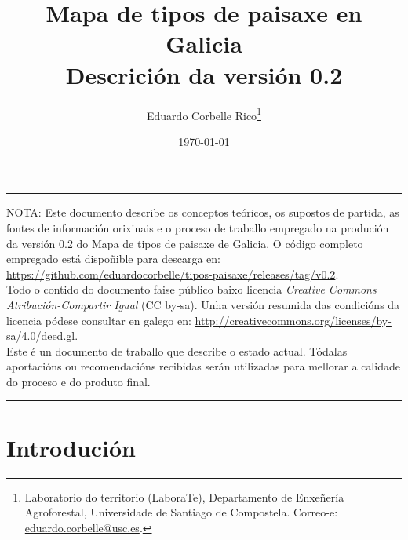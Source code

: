 \documentclass[11pt,a4paper]{article}
\title{Mapa de tipos de paisaxe en Galicia\\Descrición da versión 0.2}
\author{Eduardo Corbelle Rico\thanks{Laboratorio do territorio (LaboraTe), Departamento de Enxeñería Agroforestal, Universidade de Santiago de Compostela. Correo-e: \href{mailto:eduardo.corbelle@usc.es}{eduardo.corbelle@usc.es}.}}
\date{\today}
\begin{document}
\maketitle

\hrule
 \vspace{.2cm}
  \begin{footnotesize}
   \noindent NOTA: Este documento describe os conceptos teóricos, os supostos de partida, as fontes de información orixinais e o proceso de traballo empregado na produción da versión 0.2 do Mapa de tipos de paisaxe de Galicia. O código completo empregado está dispoñible para descarga en: \url{https://github.com/eduardocorbelle/tipos-paisaxe/releases/tag/v0.2}.\\   
Todo o contido do documento faise público baixo licencia \emph{Creative Commons Atribución-Compartir Igual} (CC by-sa). Unha versión resumida das condicións da licencia pódese consultar en galego en: \url{http://creativecommons.org/licenses/by-sa/4.0/deed.gl}.\\
Este é un documento de traballo que describe o estado actual. Tódalas aportacións ou recomendacións recibidas serán utilizadas para mellorar a calidade do proceso e do produto final.
  \end{footnotesize}
 \vspace{.2cm}
\hrule
\bigskip

\section{Introdución}
\end{document}
